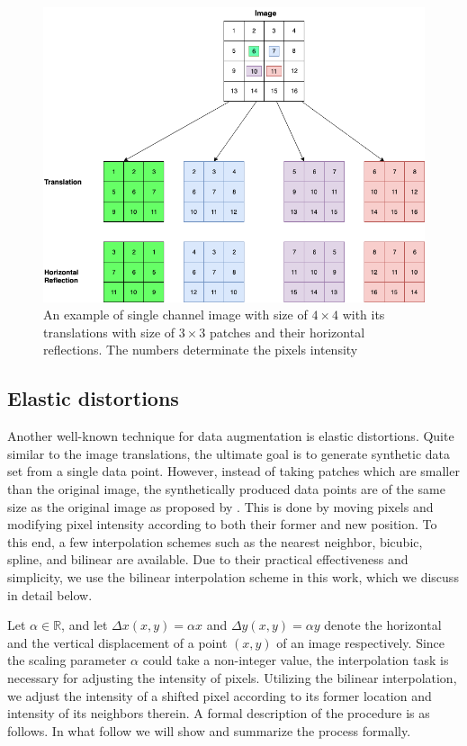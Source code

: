 \begin{figure}
  \centering
  \label{fig:label-preserving-trasformation}
  \includegraphics[width=1\textwidth]{fig/label-preserving-transformation}
  \caption{An example of single channel image with size of $4\times4$ with its translations with size of $3\times3$ patches and their horizontal reflections. The numbers determinate the pixels intensity}
\end{figure}


\subsection{Elastic distortions}
\label{tit:elastic-distrotion}
Another well-known technique for data augmentation is elastic distortions. Quite similar to the image
translations, the ultimate goal is to generate synthetic data set from a single data point. However, instead of
taking patches which are smaller than the original image, the synthetically produced data points are
of the same size as the original image as proposed by \cite{elastic_distortion_paper} . This is done by moving pixels and modifying pixel intensity
according to both their former and new position.  To this end, a few interpolation schemes such as
the nearest neighbor, bicubic, spline, and bilinear are available. Due to their practical
effectiveness and simplicity, we use the bilinear interpolation scheme in this work, which we
discuss in detail below.

Let $\alpha \in \mathbb{R}$, and let $\Delta x(x,  y) = \alpha x$ and $\Delta y(x,  y) = \alpha y$
denote the horizontal and the vertical displacement of a point $(x, y)$ of an image respectively.
Since the scaling parameter $\alpha$ could take a non-integer value, the interpolation task is
necessary for adjusting the intensity of pixels. Utilizing the bilinear interpolation, we adjust the
intensity of a shifted pixel according to its former location and intensity of its neighbors
therein. A formal description of the procedure is as follows. In what follow we will show and summarize the
process formally.

